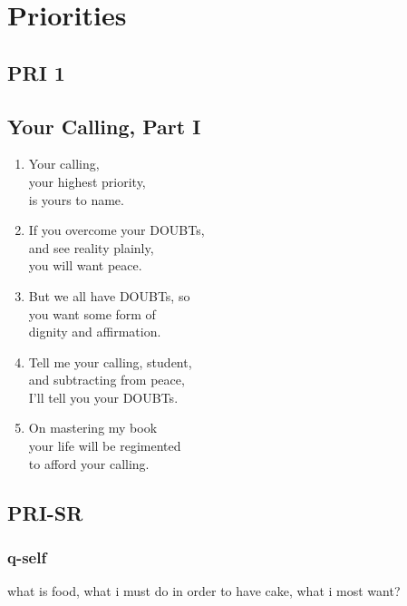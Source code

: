 \documentclass[
]{book}
\begin{document}
\hypertarget{priorities}{%
\chapter{Priorities}\label{priorities}}

\hypertarget{pri-1}{%
\section{PRI 1}\label{pri-1}}

\hypertarget{your-calling-part-i}{%
\section{Your Calling, Part I}\label{your-calling-part-i}}

\begin{enumerate}
\def\labelenumi{\arabic{enumi}.}
\item
  Your calling,\\
  your highest priority,\\
  is yours to name.
\item
  If you overcome your DOUBTs,\\
  and see reality plainly,\\
  you will want peace.
\item
  But we all have DOUBTs, so\\
  you want some form of\\
  dignity and affirmation.
\item
  Tell me your calling, student,\\
  and subtracting from peace,\\
  I'll tell you your DOUBTs.
\item
  On mastering my book\\
  your life will be regimented\\
  to afford your calling.
\end{enumerate}

\hypertarget{pri-sr}{%
\section{PRI-SR}\label{pri-sr}}

\hypertarget{q-self}{%
\subsection{q-self}\label{q-self}}

what is food,
what i must do in order to have cake,
what i most want?
\end{document}
